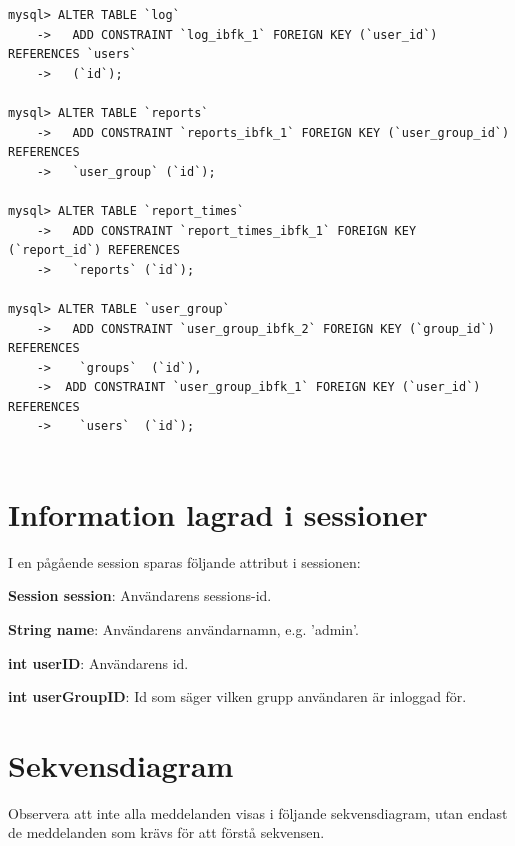 \documentclass[a4paper]{article}
\begin{document}
\begin{lstlisting}
mysql> ALTER TABLE `log`
    ->   ADD CONSTRAINT `log_ibfk_1` FOREIGN KEY (`user_id`) REFERENCES `users`
    ->   (`id`);

mysql> ALTER TABLE `reports`
    ->   ADD CONSTRAINT `reports_ibfk_1` FOREIGN KEY (`user_group_id`) REFERENCES
    ->   `user_group` (`id`);

mysql> ALTER TABLE `report_times`
    ->   ADD CONSTRAINT `report_times_ibfk_1` FOREIGN KEY (`report_id`) REFERENCES
    ->   `reports` (`id`);

mysql> ALTER TABLE `user_group`
    ->   ADD CONSTRAINT `user_group_ibfk_2` FOREIGN KEY (`group_id`) REFERENCES
    ->    `groups`  (`id`),
    ->  ADD CONSTRAINT `user_group_ibfk_1` FOREIGN KEY (`user_id`) REFERENCES
    ->    `users`  (`id`);
  
\end{lstlisting}


\section{Information lagrad i sessioner}
I en pågående session sparas följande attribut i sessionen:

\vspace{5mm}
\begin{hangparas}{1.5em}{1}
\textbf{Session session}: Användarens sessions-id.
\end{hangparas}

\vspace{5mm}
\begin{hangparas}{1.5em}{1}
\textbf{String name}: Användarens användarnamn, e.g. 'admin'. 
\end{hangparas}

\vspace{5mm}
\begin{hangparas}{1.5em}{1}
\textbf{int userID}: Användarens id. 
\end{hangparas}

\vspace{5mm}
\begin{hangparas}{1.5em}{1}
\textbf{int userGroupID}: Id som säger vilken grupp användaren är inloggad för. 
\end{hangparas}

\section{Sekvensdiagram}

Observera att inte alla meddelanden visas i följande sekvensdiagram, utan endast de meddelanden som krävs för att förstå sekvensen.
\end{document}
